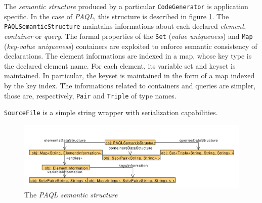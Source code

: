\documentclass[10pt]{article}  %
\begin{document}
    The \emph{semantic structure} produced by a particular \texttt{CodeGenerator} is application specific. In the case of \emph{PAQL},
    this structure is described in figure \ref{fig:semanticStructure}.
    The \texttt{PAQLSemanticStructure} maintains informations about each declared \emph{element}, \emph{container} or \emph{query}.
    The formal properties of the \texttt{Set} (\emph{value uniqueness}) and \texttt{Map} (\emph{key-value uniqueness}) containers
    are exploited to enforce semantic consistency of declarations.
    The element informations are indexed in a map, whose key type is the declared element name.
    For each element, its variable set and keyset is maintained. In particular, the keyset is maintained in the form of a map indexed by the key index.
    The informations related to containers and queries are simpler, those are, respectively, \texttt{Pair} and \texttt{Triple} of type names.

    \texttt{SourceFile} is a simple string wrapper with serialization capabilities.
    \begin{figure}[htbp]
        \centering
        \includegraphics[scale=0.45]{semanticStructure.pdf}
        \caption{The \emph{PAQL semantic structure}}\label{fig:semanticStructure}
    \end{figure}
\end{document}

